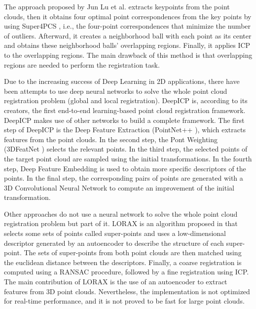         The approach proposed by Jun Lu et al. \cite{Lu_2019_4pcsicp} extracts keypoints from the point clouds, 
        then it obtains four optimal point correspondences from the key points by using Super4PCS \cite{Mellado_2014_super4pcs},
        i.e., the four-point correspondences that minimize the number of outliers. 
        Afterward, it creates a neighborhood ball with each point as its center and obtains these neighborhood balls’ overlapping regions. 
        Finally, it applies ICP to the overlapping regions. 
        The main drawback of this method is that overlapping regions are needed to perform the registration task.

        Due to the increasing success of Deep Learning in 2D applications, there have been attempts to use deep neural networks
        to solve the whole point cloud registration problem (global and local registration).
        DeepICP \cite{Lu_2019_deepicp} is, according to its creators, the first end-to-end learning-based point cloud registration framework.
        DeepICP makes use of other networks to build a complete framework.
        The first step of DeepICP is the Deep Feature Extraction (PointNet++ \cite{Qi_2017_pointnet}), which extracts features from the point clouds.
        In the second step, the Pont Weighting (3DFeatNet \cite{Yew_2018_3dfeat}) selects the relevant points.
        In the third step, the selected points of the target point cloud are sampled using the initial transformations.
        In the fourth step, Deep Feature Embedding is used to obtain more specific descriptors of the points.
        In the final step, the corresponding pairs of points are generated with a 3D Convolutional Neural Network
        to compute an improvement of the initial transformation.
        
        Other approaches do not use a neural network to solve the whole point cloud registration problem but part of it.
        LORAX is an algorithm proposed in \cite{Elbaz_2017_3dpoint} that selects some sets of points called super-points and uses a low-dimensional descriptor 
        generated by an autoencoder to describe the structure of each super-point.
        The sets of super-points from both point clouds are then matched using the euclidean distance between the descriptors.
        Finally, a coarse registration is computed using a RANSAC procedure, followed by a fine registration using ICP.
        The main contribution of LORAX is the use of an autoencoder to extract features from 3D point clouds. 
        Nevertheless, the implementation is not optimized for real-time performance, and it is not proved to be fast for large point clouds.

